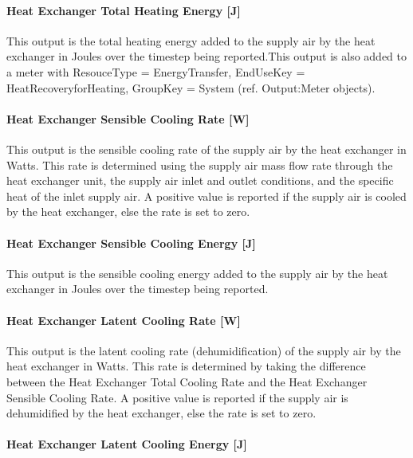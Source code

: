 \paragraph{Heat Exchanger Total Heating Energy {[}J{]}}\label{heat-exchanger-total-heating-energy-j-1}

This output is the total heating energy added to the supply air by the heat exchanger in Joules over the timestep being reported.This output is also added to a meter with ResouceType = EnergyTransfer, EndUseKey = HeatRecoveryforHeating, GroupKey = System (ref. Output:Meter objects).

\paragraph{Heat Exchanger Sensible Cooling Rate {[}W{]}}\label{heat-exchanger-sensible-cooling-rate-w-1}

This output is the sensible cooling rate of the supply air by the heat exchanger in Watts. This rate is determined using the supply air mass flow rate through the heat exchanger unit, the supply air inlet and outlet conditions, and the specific heat of the inlet supply air. A positive value is reported if the supply air is cooled by the heat exchanger, else the rate is set to zero.

\paragraph{Heat Exchanger Sensible Cooling Energy {[}J{]}}\label{heat-exchanger-sensible-cooling-energy-j-1}

This output is the sensible cooling energy added to the supply air by the heat exchanger in Joules over the timestep being reported.

\paragraph{Heat Exchanger Latent Cooling Rate {[}W{]}}\label{heat-exchanger-latent-cooling-rate-w-1}

This output is the latent cooling rate (dehumidification) of the supply air by the heat exchanger in Watts. This rate is determined by taking the difference between the Heat Exchanger Total Cooling Rate and the Heat Exchanger Sensible Cooling Rate. A positive value is reported if the supply air is dehumidified by the heat exchanger, else the rate is set to zero.

\paragraph{Heat Exchanger Latent Cooling Energy {[}J{]}}\label{heat-exchanger-latent-cooling-energy-j-1}

